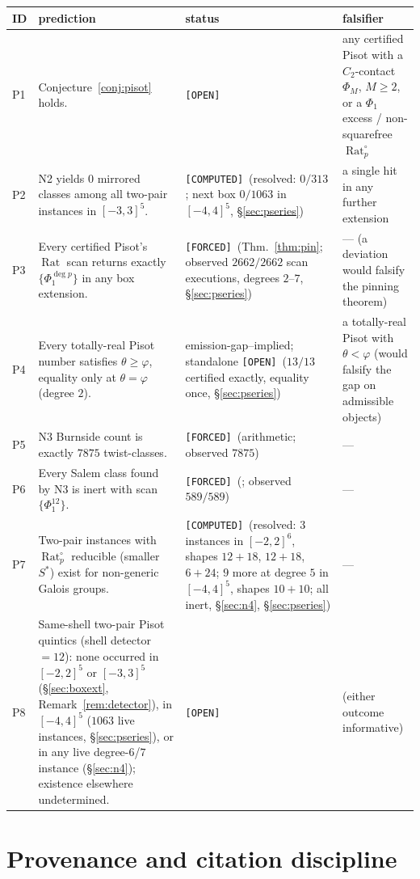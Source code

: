 \documentclass[11pt]{article}
\newcommand{\F}{\textnormal{\texttt{[FORCED]}}}
\newcommand{\C}{\textnormal{\texttt{[COMPUTED]}}}
\newcommand{\Op}{\textnormal{\texttt{[OPEN]}}}
\newcommand{\Rat}{\operatorname{Rat}}
\theoremstyle{definition}
\begin{document}
\begin{center}
\small
\begin{tabular}{p{0.6cm}p{8.2cm}p{2.4cm}p{3.6cm}}
\hline
ID & prediction & status & falsifier\\
\hline
P1 & Conjecture~\ref{conj:pisot} holds. & \Op & any certified Pisot with a
$C_2$-contact $\Phi_M$, $M\ge2$, or a $\Phi_1$ excess / non-squarefree
$\Rat_p^{\circ}$\\
P2 & N2 yields $0$ mirrored classes among all two-pair instances in
$[-3,3]^5$. & \C\ (resolved: $0/313$; next box $0/1063$ in $[-4,4]^5$,
\S\ref{sec:pseries}) & a single hit in any further extension\\
P3 & Every certified Pisot's $\Rat$ scan returns exactly $\{\Phi_1^{\deg p}\}$
in any box extension. & \F\ (Thm.~\ref{thm:pin}; observed $2662/2662$
scan executions, degrees $2$--$7$, \S\ref{sec:pseries}) & --- (a deviation
would falsify the pinning theorem)\\
P4 & Every totally-real Pisot number satisfies $\theta\ge\varphi$, equality
only at $\theta=\varphi$ (degree $2$). & emission-gap--implied; standalone
\Op\ ($13/13$ certified exactly, equality once, \S\ref{sec:pseries}) & a
totally-real Pisot with $\theta<\varphi$ (would falsify the gap on
admissible objects)\\
P5 & N3 Burnside count is exactly $7875$ twist-classes. & \F\ (arithmetic;
observed $7875$) & ---\\
P6 & Every Salem class found by N3 is inert with scan $\{\Phi_1^{12}\}$.
& \F\ (\cite[Cor.~7.14]{relcharge}; observed $589/589$) & ---\\
P7 & Two-pair instances with $\Rat_p^{\circ}$ reducible (smaller $S^{*}$)
exist for non-generic Galois groups. & \C\ (resolved: $3$ instances in
$[-2,2]^6$, shapes $12{+}18$, $12{+}18$, $6{+}24$; $9$ more at degree $5$
in $[-4,4]^5$, shapes $10{+}10$; all inert, \S\ref{sec:n4},
\S\ref{sec:pseries}) & ---\\
P8 & Same-shell two-pair Pisot quintics (shell detector $=12$): none occurred
in $[-2,2]^5$ or $[-3,3]^5$ (\S\ref{sec:boxext},
Remark~\ref{rem:detector}), in $[-4,4]^5$ ($1063$ live instances,
\S\ref{sec:pseries}), or in any live degree-$6$/$7$ instance
(\S\ref{sec:n4}); existence elsewhere undetermined.
& \Op & (either outcome informative)\\
\hline
\end{tabular}
\end{center}

\section{Provenance and citation discipline}\label{sec:provenance}
\end{document}
